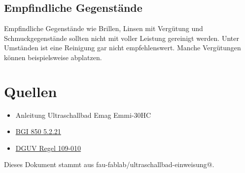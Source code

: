 \documentclass{\basedir/fablab-document}
\begin{document}
\subsection{Empfindliche Gegenstände}
Empfindliche Gegenstände wie Brillen, Linsen mit Vergütung und Schmuckgegenstände sollten nicht mit voller Leistung gereinigt werden.
Unter Umständen ist eine Reinigung gar nicht empfehlenswert.
Manche Vergütungen können beispielsweise abplatzen.

 \section{Quellen}
  \begin{itemize}
   \item Anleitung Ultraschallbad Emag Emmi-30HC
   \item \href{http://bgi850-0.vur.jedermann.de/index.jsp?isbn=bgi850-0&alias=bgc_bi850_0_bi850_0_s5_2_21_}{BGI 850 5.2.21}
   \item \href{http://www.arbeitssicherheit.de/de/html/library/document/4989034,37}{DGUV Regel 109-010}
  \end{itemize}



Dieses Dokument stammt aus fau-fablab/ultraschallbad-einweisung@\Revision{}.
\end{document}
